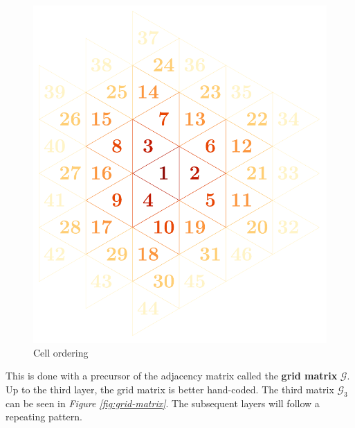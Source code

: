 \documentclass{article}
\begin{document}
\begin{figure}[H]
    \centering
        \includegraphics[width=.37\textwidth]{graphics/implementation/cell-ordering.pdf}
    \caption{Cell ordering}
    \label{fig:cell-ordering}
\end{figure}

This is done with a precursor of the adjacency matrix called the \textbf{grid matrix} $\mathcal{G}$. Up to the third layer, the grid matrix is better hand-coded. The third matrix $\mathcal{G}_3$ can be seen in \textit{Figure \ref{fig:grid-matrix}}. The subsequent layers will follow a repeating pattern.
\end{document}

